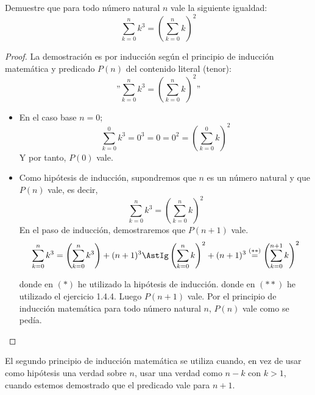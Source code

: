 \begin{ejercicio}
    Demuestre que para todo número natural $n$ vale la siguiente igualdad:
    $$\sum_{k=0}^n k^3 = \left(\sum_{k=0}^n k\right)^2$$
\end{ejercicio}
\begin{proof}
    La demostración es por inducción según el principio de inducción matemática y predicado $P(n)$ del contenido literal (tenor):
    $$\mbox{''}\sum_{k=0}^n k^3 = \left(\sum_{k=0}^n k\right)^2\mbox{''}$$
    \begin{itemize}
        \item En el caso base $n = 0$;
        $$\sum_{k=0}^0 k^3 = 0^3 = 0 = 0^2 = \left(\sum_{k=0}^0 k\right)^2$$
        Y por tanto, $P(0)$ vale.\\
    \item Como hipótesis de inducción, supondremos que $n$ es un número natural y que $P(n)$ vale, es decir, 
        $$\sum_{k=0}^n k^3 = \left(\sum_{k=0}^n k\right)^2$$
        En el paso de inducción, demostraremos que $P(n+1)$ vale.
        $$\sum_{k=0}^n k^3 = \left(\sum_{k=0}^n k^3\right) + (n+1)^3 \AstIg \left(\sum_{k=0}^n k\right)^2 + (n+1)^3 \stackrel{(\ast\ast)}{=} \left(\sum_{k=0}^{n+1} k\right)^2  $$

        donde en $(\ast)$ he utilizado la hipótesis de inducción.\newline
        donde en $(\ast\ast)$ he utilizado el ejercicio 1.4.4.\newline
        Luego $P(n+1)$ vale.\newline
        Por el principio de inducción matemática para todo número natural $n$, $P(n)$ vale como se pedía.
    \end{itemize}
\end{proof}

\begin{observacion}
    El segundo principio de inducción matemática se utiliza cuando, en vez de usar como hipótesis una verdad sobre $n$, usar una verdad como $n-k$ con $k >1$, cuando estemos demostrado que el predicado vale para $n+1$.
\end{observacion}

